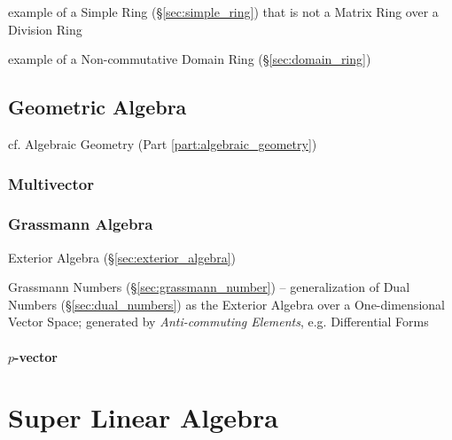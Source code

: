 {{example of a Simple Ring (\S\ref{sec:simple_ring}) that is not a Matrix Ring
over a Division Ring

example of a Non-commutative Domain Ring (\S\ref{sec:domain_ring})



\subsection{Geometric Algebra}\label{sec:geometric_algebra}

cf. Algebraic Geometry (Part \ref{part:algebraic_geometry})



\subsubsection{Multivector}\label{sec:multivector}

\subsubsection{Grassmann Algebra}\label{sec:grassmann_algebra}


Exterior Algebra (\S\ref{sec:exterior_algebra})

\fist Grassmann Numbers (\S\ref{sec:grassmann_number}) -- generalization of Dual
Numbers (\S\ref{sec:dual_numbers}) as the Exterior Algebra over a
One-dimensional Vector Space; generated by \emph{Anti-commuting Elements}, e.g.
Differential Forms



\paragraph{$p$-vector}\label{sec:p_vector}\hfill



\section{Super Linear Algebra}\label{sec:super_linear_algebra}

}}
